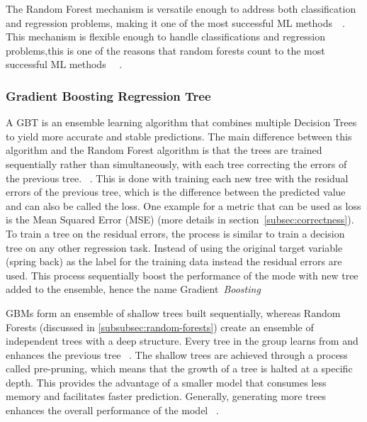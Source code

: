 The Random Forest mechanism is versatile enough to address both classification and regression problems, making it one
of the most successful
\ac{ML} methods~\cite[p. 3--4]{biau2016random}~\cite[p. 25]{breiman2001random}.
This mechanism is flexible enough to handle classifications and regression problems,this is one of the reasons that
random forests count to the most successful \ac{ML}
methods
~\cite[p. 3--4]{biau2016random}~\cite[p. 25]{breiman2001random}.

\subsubsection{Gradient Boosting Regression Tree}

A \ac{GBT} is an ensemble learning algorithm that combines multiple Decision Trees
to yield more accurate and stable predictions.
The main difference between this algorithm and the Random Forest algorithm is that the trees are trained sequentially
rather than simultaneously, with each tree correcting the errors of the previous tree.
~\cite[p. 88--89]{muller2016introduction}.
This is done with training each new tree with the residual errors of the previous tree, which is the
difference between the predicted value and can also be called the loss.
One example for a metric that can be used as loss is the Mean Squared Error (MSE) (more details in
section~\ref{subsec:correctness}).
To train a tree on the residual errors, the process is similar to train a decision tree on any other regression
task.
Instead of using the original target variable (spring back) as the label for the training data instead the
residual errors are used.
This process sequentially boost the performance of the mode with new tree added to the
ensemble, hence the name Gradient~\textit{Boosting}
~\cite[p. 222]{boehmke2019hands}

GBMs form an ensemble of shallow trees built sequentially, whereas Random Forests (discussed in
\cref{subsubsec:random-forests}) create an ensemble of independent trees with a deep structure.
Every tree in the group learns from and enhances the previous tree
~\cite[p. 221]{boehmke2019hands}.
The shallow trees are achieved through a process called pre-pruning, which means that the growth of a tree is halted
at a specific depth.
This provides the advantage of a smaller model that consumes less memory and facilitates faster prediction.
Generally, generating more trees enhances the overall performance of the
model
~\cite[pp. 74, 88--89]{muller2016introduction}.

